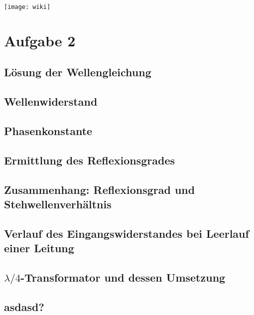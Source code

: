 \documentclass[a4paper, 12pt]{article}
\begin{document}
 \begin{center}
 \texttt{[image: wiki]}
 \end{center}

 \section{Aufgabe 2} 

 \subsection{Lösung der Wellengleichung}


 \subsection{Wellenwiderstand}

 \subsection{Phasenkonstante}


 \subsection{Ermittlung des Reflexionsgrades}

 \subsection{Zusammenhang: Reflexionsgrad und Stehwellenverhältnis}

 \subsection{Verlauf des Eingangswiderstandes bei Leerlauf einer Leitung}
 
 \subsection{$\lambda/4$-Transformator und dessen Umsetzung}

 \subsection{asdasd?}

 
\end{document}
